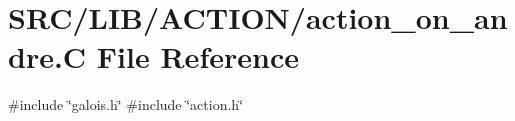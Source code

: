 \hypertarget{action__on__andre_8_c}{}\section{S\+R\+C/\+L\+I\+B/\+A\+C\+T\+I\+O\+N/action\+\_\+on\+\_\+andre.C File Reference}
\label{action__on__andre_8_c}
{\ttfamily \#include \char`\"{}galois.\+h\char`\"{}}\newline
{\ttfamily \#include \char`\"{}action.\+h\char`\"{}}\newline
